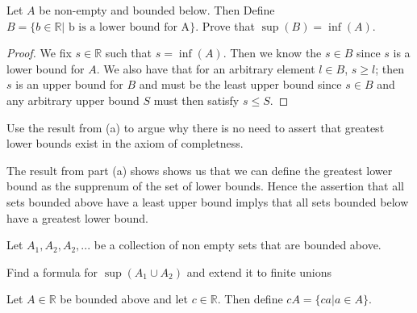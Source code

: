 \documentclass[11pt,largemargins]{homework}
\newcommand{\R}{\mathbb{R}}
\begin{document}
\question 

\begin{alphaparts}
    \questionpart 
    Let $A$ be non-empty and bounded below. Then
    Define $B = \{ b \in \R | \text{ b is a lower bound for A} \}$. Prove that 
    $\sup(B) = \inf(A)$. 

    \begin{proof}
        We fix $s \in \R$ such that $s = \inf(A)$. Then we know the $s \in B$ since $s$ is a lower bound for $A$. We also have that 
        for an arbitrary element $l \in B$, $s \geq l$; then $s$ is an upper bound for $B$ and must be the least upper bound since 
        $s \in B$ and any arbitrary upper bound $S$ must then satisfy $s \leq S$. 
    \end{proof}

    \questionpart 
    Use the result from (a) to argue why there is no need to assert that greatest lower bounds exist in the axiom of completness. 

    The result from part (a) shows shows us that we can define the greatest lower bound as the supprenum of the set of lower bounds. 
    Hence the assertion that all sets bounded above have a least upper bound implys that all sets bounded below have a greatest lower bound. 
\end{alphaparts}

\question 
Let $A_1, A_2, A_2, ... $ be a collection of non empty sets that are bounded above. 

\begin{alphaparts}
    \questionpart
    Find a formula for $\sup(A_1 \cup A_2)$ and extend it to finite unions 
\end{alphaparts}


\question
Let $A \in \R$ be bounded above and let $c \in \R$. Then define $cA = \{ ca | a \in A \} $. 
\end{document}
